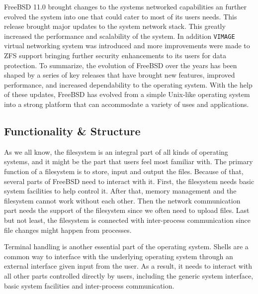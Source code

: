 \documentclass[12pt, dvipsnames, a4paper]{article}
\newcommand{\code}[1]{\texttt{#1}}
\begin{document}
FreeBSD 11.0 brought changes to the systems networked capabilities an further evolved the system into one that could cater to most of its users needs. This release brought major updates to the system network stack. This greatly increased the performance and scalability of the system. In addition \code{VIMAGE} virtual networking system was introduced and more improvements were made to ZFS support bringing further security enhancements to its users for data protection.
To summarize, the evolution of FreeBSD over the years has been shaped by a series of key releases that have brought new features, improved performance, and increased dependability to the operating system. With the help of these updates, FreeBSD has evolved from a simple Unix-like operating system into a strong platform that can accommodate a variety of uses and applications.

\subsection{Functionality \& Structure}
As we all know, the filesystem is an integral part of all kinds of operating systems, and it might be the part that users feel most familiar with. The primary function of a filesystem is to store, input and output the files. Because of that, several parts of FreeBSD need to interact with it. First, the filesystem needs basic system facilities to help control it. After that, memory management and the filesystem cannot work without each other. Then the network communication part needs the support of the filesystem since we often need to upload files. Last but not least, the filesystem is connected with inter-process communication since file changes might happen from processes.


Terminal handling is another essential part of the operating system. Shells are a common way to interface with the underlying operating system through an external interface given input from the user. As a result, it needs to interact with all other parts controlled directly by users, including the generic system interface, basic system facilities and inter-process communication.
\end{document}
